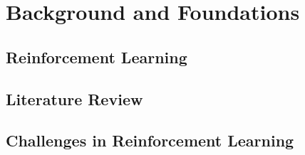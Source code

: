 
\chapter{Background and Foundations}\label{chapter:Background and Foundations}


\section{Reinforcement Learning}

\section{Literature Review}

\section{Challenges in Reinforcement Learning}